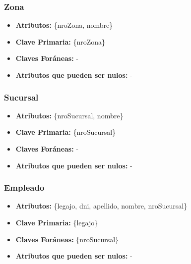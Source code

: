 \documentclass[a4paper,11pt]{article}
\begin{document}
\subsubsection{Zona}

\begin{itemize}

	\item \textbf{Atributos:} \{nroZona, nombre\}
	
	\item \textbf{Clave Primaria:} \{nroZona\}
	
	\item \textbf{Claves Foráneas:} -

	\item \textbf{Atributos que pueden ser nulos:} -
	
\end{itemize}

\subsubsection{Sucursal}

\begin{itemize}

	\item \textbf{Atributos:} \{nroSucursal, nombre\}
	
	\item \textbf{Clave Primaria:} \{nroSucursal\}
	
	\item \textbf{Claves Foráneas:} -

	\item \textbf{Atributos que pueden ser nulos:} -
	
\end{itemize}

\subsubsection{Empleado}

\begin{itemize}

	\item \textbf{Atributos:} \{legajo, dni, apellido, nombre, nroSucursal\}
	
	\item \textbf{Clave Primaria:} \{legajo\}
	
	\item \textbf{Claves Foráneas:} \{nroSucursal\}

	\item \textbf{Atributos que pueden ser nulos:} -
	
\end{itemize}
\end{document}
